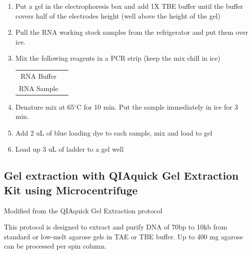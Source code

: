 \documentclass[11pt, oneside]{article}
\begin{document}
		\begin{enumerate}
			\item Put a gel in the electrophoresis box and add 1X TBE buffer until the buffer covers half of the electrodes height (well above the height of 			the gel) 
			\item Pull the RNA working stock samples from the refrigerator and put them over ice. 
			\item Mix the following reagents in a PCR strip (keep the mix chill in ice)	
			
			\begin{table}[H]
				\centering
				\begin{tabular}{| c | >{\centering\arraybackslash} m{10em} |}
				\hline
				\cellcolor{gray}{\bf Reagents} & \cellcolor{gray}{\bf Volume (uL)} \\
				\hline 
				RNA Buffer & 8 \\
				RNA Sample & 2 \\
				\hline
				\end{tabular}
			\end{table}	
	
			\item Denature mix at 65$^{\circ}$C for 10 min. Put the sample immediately in ice for 3 min.
			\item Add 2 uL of blue loading dye to each sample, mix and load to gel
			\item Load up 3 uL of ladder to a gel well
		\end{enumerate}
		
	\newpage

	\subsection{Gel extraction with QIAquick Gel Extraction Kit using Microcentrifuge}

		\begin{adjustwidth}{0.25in}{0pt} Modified from the QIAquick Gel Extraction protocol \end{adjustwidth}

		\vspace{3mm}

		
		\noindent This protocol is designed to extract and purify DNA of 70bp to 10kb from standard or low-melt agarose gels in TAE or TBE buffer. Up to 		400 mg agarose can be processed per spin column. 
		
		\vspace{3mm}
		
\end{document}
